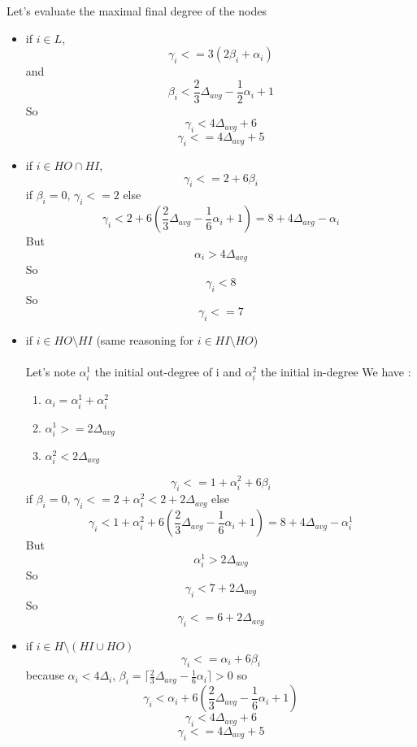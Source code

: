 \documentclass{article}
\begin{document}
Let's evaluate the maximal final degree of the nodes
\begin{itemize}
  \item if $i \in L$,
  $$\gamma_i <= 3(2\beta_i +\alpha_i)$$
  and
  $$\beta_i < \frac{2}{3}\Delta_{avg} - \frac{1}{2}\alpha_i + 1$$
  So
  $$\gamma_i < 4\Delta_{avg} + 6$$
  $$\gamma_i <= 4\Delta_{avg} + 5$$
  \item if $i \in HO \cap HI$,
  $$\gamma_i <= 2 + 6\beta_i$$
  if $\beta_i = 0$, $\gamma_i <= 2$
  else
  $$\gamma_i < 2 + 6(\frac{2}{3}\Delta_{avg} - \frac{1}{6}\alpha_i + 1) = 8 + 4\Delta_{avg} - \alpha_i$$
  But $$\alpha_i > 4\Delta_{avg}$$
  So $$\gamma_i < 8$$
  So $$\gamma_i <= 7$$
  \item if $i \in HO \setminus HI$ (same reasoning for $i \in HI \setminus HO$)\\\\
  Let's note $\alpha_i^1$ the initial out-degree of i and $\alpha_i^2$ the initial in-degree
  We have :
  \begin{enumerate}
    \item $\alpha_i = \alpha_i^1 + \alpha_i^2$
    \item $\alpha_i^1 >= 2\Delta_{avg}$
    \item $\alpha_i^2 < 2\Delta_{avg}$
  \end{enumerate}
  $$\gamma_i <= 1 + \alpha_i^2 + 6\beta_i$$
  if $\beta_i = 0$, $\gamma_i <= 2 + \alpha_i^2 < 2 + 2\Delta_{avg}$
  else
  $$\gamma_i < 1 + \alpha_i^2 + 6(\frac{2}{3}\Delta_{avg} - \frac{1}{6}\alpha_i + 1) = 8 + 4\Delta_{avg} - \alpha_i^1$$
  But $$\alpha_i^1 > 2\Delta_{avg}$$
  So $$\gamma_i < 7 + 2\Delta_{avg}$$
  So $$\gamma_i <= 6 + 2\Delta_{avg}$$
  \item if $i \in H \setminus (HI \cup HO)$
  $$\gamma_i <= \alpha_i + 6\beta_i$$
  because $\alpha_i < 4\Delta_i$, $\beta_i = \lceil\frac{2}{3}\Delta_{avg}-\frac{1}{6}\alpha_i\rceil > 0$
  so $$\gamma_i < \alpha_i + 6(\frac{2}{3}\Delta_{avg}-\frac{1}{6}\alpha_i + 1)$$
  $$\gamma_i < 4\Delta_{avg} + 6$$
  $$\gamma_i <= 4\Delta_{avg} + 5$$
\end{itemize}
\end{document}
